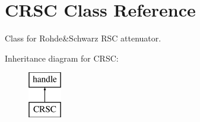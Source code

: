 \hypertarget{class_c_r_s_c}{\section{C\-R\-S\-C Class Reference}
\label{class_c_r_s_c}
}


Class for Rohde\&Schwarz R\-S\-C attenuator.  


Inheritance diagram for C\-R\-S\-C\-:\begin{figure}[H]
\begin{center}
\leavevmode
\includegraphics[height=2.000000cm]{class_c_r_s_c}
\end{center}
\end{figure}
